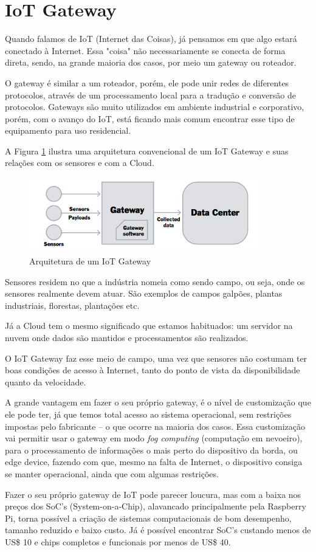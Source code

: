 \section{IoT Gateway}
\label{sec:iotGateway}

Quando falamos de IoT (Internet das Coisas), já pensamos em que algo estará conectado à Internet. Essa "coisa"  não necessariamente se conecta de forma direta, sendo, na grande maioria dos casos, por meio um gateway ou roteador.

O gateway é similar a um roteador, porém, ele pode unir redes de diferentes protocolos, através de um processamento local para a tradução e conversão de protocolos. Gateways são muito utilizados em ambiente industrial e corporativo, porém, com o avanço do IoT, está ficando mais comum encontrar esse tipo de equipamento para uso residencial.

A Figura \ref{fig:arquiteturaIotGateway} ilustra uma arquitetura convencional de um IoT Gateway e suas relações com os sensores e com a Cloud.

\begin{figure}[H]
	\centering
	\includegraphics[width=0.9\textwidth]{./img/rumFxS7.png}
	\caption{Arquitetura de um IoT Gateway}
	\label{fig:arquiteturaIotGateway}
\end{figure}


Sensores residem no que a indústria nomeia como sendo campo, ou seja, onde os sensores realmente devem atuar. São exemplos de campos galpões, plantas industriais, florestas, plantações etc.

Já a Cloud tem o mesmo significado que estamos habituados: um servidor na nuvem onde dados são mantidos e processamentos são realizados.

O IoT Gateway faz esse meio de campo, uma vez que sensores não costumam ter boas condições de acesso à Internet, tanto do ponto de vista da disponibilidade quanto da velocidade.

A grande vantagem em fazer o seu próprio gateway, é o nível de customização que ele pode ter, já que temos total acesso ao sistema operacional, sem restrições impostas pelo fabricante – o que ocorre na maioria dos casos. Essa customização vai permitir usar o gateway em modo \textit{fog computing} (computação em nevoeiro), para o processamento de informações o mais perto do dispositivo da borda, ou edge device, fazendo com que, mesmo na falta de Internet, o dispositivo consiga se manter operacional, ainda que com algumas restrições.

Fazer o seu próprio gateway de IoT pode parecer loucura, mas com a baixa nos preços dos SoC’s (System-on-a-Chip), alavancado principalmente pela Raspberry Pi\cite{RaspberryPi}, torna possível a criação de sistemas computacionais de bom desempenho, tamanho reduzido e baixo custo. Já é possível encontrar SoC’s custando menos de US\$ 10 e chips completos e funcionais por menos de US\$ 40.